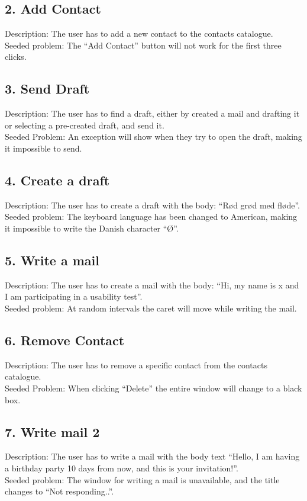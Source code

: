 \subsection*{2. Add Contact}
Description: The user has to add a new contact to the contacts catalogue.\\
Seeded problem: The ``Add Contact'' button will not work for the first three clicks.
\subsection*{3. Send Draft}
Description: The user has to find a draft, either by created a mail and drafting it or selecting a pre-created draft, and send it.\\
Seeded Problem: An exception will show when they try to open the draft, making it impossible to send.
\subsection*{4. Create a draft}
Description: The user has to create a draft with the body: ``Rød grød med fløde''.\\
Seeded problem: The keyboard language has been changed to American, making it impossible to write the Danish character ``Ø''.
\subsection*{5. Write a mail}
Description: The user has to create a mail with the body: ``Hi, my name is x and I am participating in a usability test''.\\
Seeded problem: At random intervals the caret will move while writing the mail.
\subsection*{6. Remove Contact}
Description: The user has to remove a specific contact from the contacts catalogue.\\
Seeded Problem: When clicking ``Delete'' the entire window will change to a black box.
\subsection*{7. Write mail 2}
Description: The user has to write a mail with the body text ``Hello, I am having a birthday party 10 days from now, and this is your invitation!''.\\
Seeded problem: The window for writing a mail is unavailable, and the title changes to ``Not responding..''.

